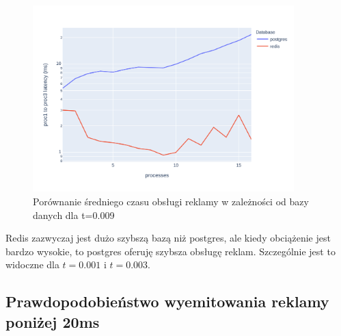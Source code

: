 \documentclass[polish, 10pt]{article}
\begin{document}
\begin{figure}[H]
    \centering
    \includegraphics[width=0.9\textwidth]{./graphs/diff_in_end_postgres_vs_redis0009.png}
    \caption{Porównanie średniego czasu obsługi reklamy w zależności od bazy danych dla t=0.009}
\end{figure}

Redis zazwyczaj jest dużo szybszą bazą niż postgres, ale kiedy obciążenie jest bardzo wysokie, to postgres oferuję szybsza obsługę reklam. Szczególnie jest to widoczne dla $t=0.001$ i $t=0.003$.


\subsection{Prawdopodobieństwo wyemitowania reklamy poniżej 20ms}


\end{document}
